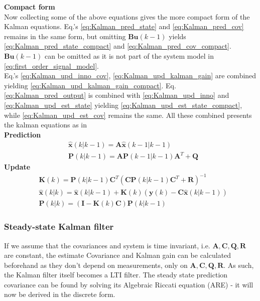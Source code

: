 \textbf{Compact form}\\
Now collecting some of the above equations gives the more compact form of the Kalman equations.
Eq.'s \ref{eq:Kalman_pred_state} and \ref{eq:Kalman_pred_cov} remains in the same form, but omitting $ \textbf{Bu}(k-1) $ yields \cref{eq:Kalman_pred_state_compact} and \cref{eq:Kalman_pred_cov_compact}. $ \textbf{Bu}(k-1) $ can be omitted as it is not part of the system model in \cref{eq:first_order_signal_model}.\\
Eq.'s \ref{eq:Kalman_upd_inno_cov}, \ref{eq:Kalman_upd_kalman_gain} are combined yielding \cref{eq:Kalman_upd_kalman_gain_compact}. Eq. \ref{eq:Kalman_pred_output} is combined with \cref{eq:Kalman_upd_inno} and \cref{eq:Kalman_upd_est_state} yielding \cref{eq:Kalman_upd_est_state_compact}, while \cref{eq:Kalman_upd_est_cov} remains the same. All these combined presents the kalman equations as in \cite{Bozic1994}\\

\textbf{Prediction}
\begin{align}
	&\hat{\textbf{x}}	(k|k-1) = \textbf{A} \hat{\textbf{x}}	(k-1|k-1) 		\label{eq:Kalman_pred_state_compact} 	\\
	&\textbf{P}			(k|k-1) = \textbf{A}\textbf{P}			(k-1|k-1)\textbf{A}^T+\textbf{Q} 				\label{eq:Kalman_pred_cov_compact} 		
\end{align}
\textbf{Update}
\begin{align}
	&\textbf{K}			(k) 		= \textbf{P}				(k|k-1)\textbf{C}^T(\textbf{C}\textbf{P}	(k|k-1)	\textbf{C}^T + \textbf{R})^{-1}										\label{eq:Kalman_upd_kalman_gain_compact} \\
	&\hat{\textbf{x}}	(k|k) 	= \hat{\textbf{x}}			(k|k-1) + \textbf{K}						(k)	(\textbf{y}		(k) - \textbf{C}\hat{\textbf{x}}		(k|k-1)) 	\label{eq:Kalman_upd_est_state_compact} \\
	&\textbf{P}			(k|k) 	= (\textbf{I} - \textbf{K}	(k)\textbf{C})\textbf{P}					(k|k-1)																		\label{eq:Kalman_upd_est_cov_compact}
\end{align}


\subsubsection{Steady-state Kalman filter}
If we assume that the covariances and system is time invariant, i.e. $ \textbf{A}, \textbf{C}, \textbf{Q}, \textbf{R} $ are constant, the estimate Covariance and Kalman gain can be calculated beforehand as they don't depend on measurements, only on $ \textbf{A}, \textbf{C}, \textbf{Q}, \textbf{R} $. As such, the Kalman filter itself becomes a LTI filter. The steady state prediction covariance can be found by solving its Algebraic Riccati equation (ARE) - it will now be derived in the discrete form.\\


